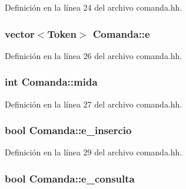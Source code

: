 Definición en la línea 24 del archivo comanda.\-hh.

\hypertarget{class_comanda_a4792137ffe62e366d017c085798e1de7}{
\subsubsection[{e}]{\setlength{\rightskip}{0pt plus 5cm}vector$<${\bf Token}$>$ Comanda\-::e\hspace{0.3cm}{\ttfamily [private]}}}\label{class_comanda_a4792137ffe62e366d017c085798e1de7}


Definición en la línea 26 del archivo comanda.\-hh.

\hypertarget{class_comanda_abaf613f247586557027ad5857ace89c2}{
\subsubsection[{mida}]{\setlength{\rightskip}{0pt plus 5cm}int Comanda\-::mida\hspace{0.3cm}{\ttfamily [private]}}}\label{class_comanda_abaf613f247586557027ad5857ace89c2}


Definición en la línea 27 del archivo comanda.\-hh.

\hypertarget{class_comanda_afa50474d0c9c08da1f3042cfddc9df24}{
\subsubsection[{e\-\_\-insercio}]{\setlength{\rightskip}{0pt plus 5cm}bool Comanda\-::e\-\_\-insercio\hspace{0.3cm}{\ttfamily [private]}}}\label{class_comanda_afa50474d0c9c08da1f3042cfddc9df24}


Definición en la línea 29 del archivo comanda.\-hh.

\hypertarget{class_comanda_a558a2944c2306c12df9f889fc96a58dd}{
\subsubsection[{e\-\_\-consulta}]{\setlength{\rightskip}{0pt plus 5cm}bool Comanda\-::e\-\_\-consulta\hspace{0.3cm}{\ttfamily [private]}}}\label{class_comanda_a558a2944c2306c12df9f889fc96a58dd}


